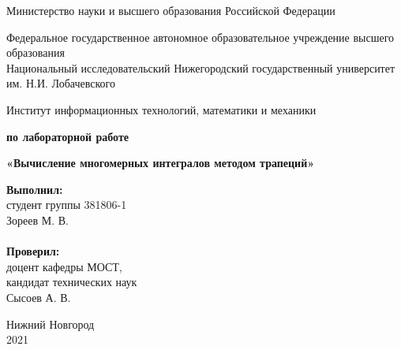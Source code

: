 \documentclass{report}
\begin{document}
\begin{titlepage}

\begin{center}
Министерство науки и высшего образования Российской Федерации
\end{center}

\begin{center}
Федеральное государственное автономное образовательное учреждение высшего образования \\
Национальный исследовательский Нижегородский государственный университет им. Н.И. Лобачевского
\end{center}

\begin{center}
Институт информационных технологий, математики и механики
\end{center}

\vspace{4em}

\begin{center}
\textbf{ по лабораторной работе} \\
\end{center}
\begin{center}
\textbf{\Large«Вычисление многомерных интегралов методом трапеций»} \\
\end{center}

\vspace{4em}

\newbox{\lbox}
\newlength{\maxl}
\setlength{\maxl}{\wd\lbox}
\hfill\parbox{7cm}{
\hspace*{5cm}\hspace*{-5cm}\textbf{Выполнил:} \\ студент группы 381806-1 \\ Зореев М. В.\\
\\
\hspace*{5cm}\hspace*{-5cm}\textbf{Проверил:}\\ доцент кафедры МОСТ, \\ кандидат технических наук \\ Сысоев А. В.\\
}
\vspace{\fill}

\begin{center} Нижний Новгород \\ 2021 \end{center}

\end{titlepage}
\end{document}
